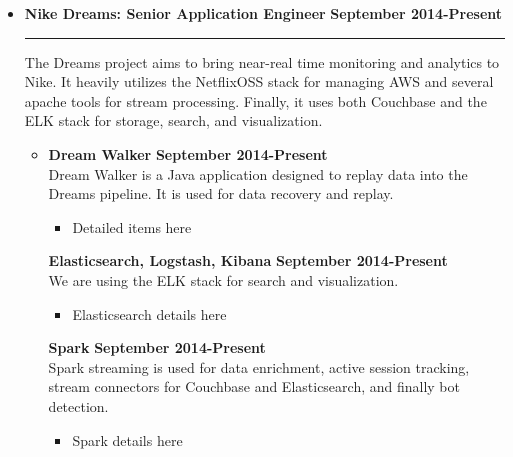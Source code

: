\documentclass[overlapped]{res}
\begin{document}
\begin{resume}
\begin{itemize}[leftmargin=0in]
    \item[] 
        \textbf{Nike Dreams: Senior Application Engineer} \hfill \textbf{September 2014-Present} \\[-0.1in] \rule{\textwidth}{0.5pt}
        The Dreams project aims to bring near-real time monitoring and analytics to Nike. It heavily utilizes the NetflixOSS stack for managing
        AWS and several apache tools for stream processing. Finally, it uses both Couchbase and the ELK stack for storage, search, and visualization.
        \vspace{0.125in}
        \begin{itemize}[leftmargin=0in]
            \item[] 
                \begin{samepage}
                    \textbf{Dream Walker} \hfill \textbf{September 2014-Present} \\
                    Dream Walker is a Java application designed to replay data into the Dreams pipeline. It is used for
                    data recovery and replay.
                    \begin{itemize}
                        \item[\textbullet] Detailed items here
                    \end{itemize}
                \end{samepage}
                \begin{samepage}
                    \textbf{Elasticsearch, Logstash, Kibana} \hfill \textbf{September 2014-Present} \\
                    We are using the ELK stack for search and visualization.
                    \begin{itemize}
                        \item[\textbullet] Elasticsearch details here
                    \end{itemize}
                \end{samepage}
                \begin{samepage}
                    \textbf{Spark} \hfill \textbf{September 2014-Present} \\
                    Spark streaming is used for data enrichment, active session tracking, stream connectors for Couchbase  
                    and Elasticsearch, and finally bot detection.
                    \begin{itemize}
                        \item[\textbullet] Spark details here

\end{itemize}
\end{samepage}
\end{itemize}
\end{itemize}
\end{resume}
\end{document}
